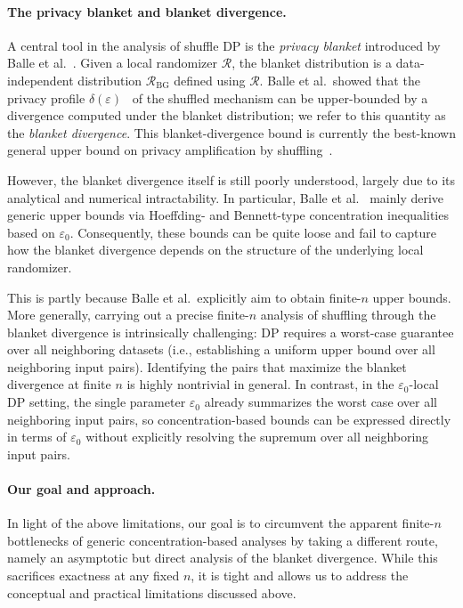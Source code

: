 \documentclass{article}
\theoremstyle{plain}
\theoremstyle{definition}
\begin{document}
\paragraph{The privacy blanket and blanket divergence.}
A central tool in the analysis of shuffle DP is the \emph{privacy blanket} introduced by Balle et al.~\cite{ballePrivacyBlanketShuffle2019}.
Given a local randomizer $\mathcal R$, the blanket distribution is a data-independent distribution $\mathcal R_{\mathrm{BG}}$ defined using $\mathcal R$.
Balle et al.\ showed that the privacy profile $\delta(\varepsilon)$~\cite{ballePrivacyAmplificationSubsampling2018a} of the shuffled mechanism can be upper-bounded by a divergence computed under the blanket distribution; we refer to this quantity as the \emph{blanket divergence}.
This blanket-divergence bound is currently the best-known general upper bound on privacy amplification by shuffling~\cite{suDecompositionBasedOptimalBounds2025}.


However, the blanket divergence itself is still poorly understood, largely due to its analytical and numerical intractability.
In particular, Balle et al.~\cite{ballePrivacyBlanketShuffle2019} mainly
derive generic upper bounds via Hoeffding- and Bennett-type concentration
inequalities based on $\varepsilon_0$.
Consequently, these bounds can be quite loose and fail to capture how the blanket divergence depends on the structure of the underlying local randomizer.


This is partly because Balle et al.\ explicitly aim to obtain finite-$n$ upper bounds.
More generally, carrying out a precise finite-$n$ analysis of shuffling through the blanket
divergence is intrinsically challenging: DP requires a worst-case guarantee over all neighboring datasets (i.e., establishing a uniform upper bound over all neighboring input pairs).
Identifying the pairs that maximize the blanket divergence at finite $n$ is highly nontrivial in general.
In contrast, in the $\varepsilon_0$-local DP setting, the single parameter $\varepsilon_0$ already summarizes the worst case over all neighboring input pairs, so concentration-based bounds can be expressed directly in terms of $\varepsilon_0$ without explicitly resolving the supremum over all neighboring input pairs.



\paragraph{Our goal and approach.}
In light of the above limitations, our goal is to circumvent the apparent finite-$n$ bottlenecks of generic concentration-based analyses by taking a different route, namely an asymptotic but direct analysis of the blanket divergence. 
While this sacrifices exactness at any fixed $n$, it is tight and allows us to address the conceptual and practical limitations discussed above.
\end{document}
